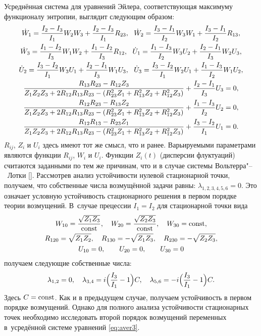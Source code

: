 Усреднённая система для уравнений Эйлера, соответствующая максимуму функционалу энтропии, выглядит следующим образом:
\begin{gather}
\dot{W}_{1}= \frac {I_2-I_3}{I_1} W_2 W_3 + \frac {I_2-I_3}{I_1} R_{23},~~\dot{W}_{2}= \frac {I_3-I_1}{I_2} W_3 W_1 + \frac {I_3-I_1}{I_2} R_{13},\notag \\
\dot{W}_{3}= \frac {I_1-I_2}{I_3} W_1 W_2 + \frac {I_1-I_2}{I_3} R_{12},~~
\dot{U}_{1}= \frac {I_1-I_3}{I_2} W_3 U_2 + \frac {I_2-I_1}{I_3} W_2 U_3,\notag \\
\dot{U}_{2}= \frac {I_3-I_2}{I_1} W_3 U_1 + \frac {I_2-I_1}{I_3} W_1 U_3,~~\dot{U}_{3}= \frac {I_3-I_2}{I_1} W_2 U_1 + \frac {I_1-I_3}{I_2} W_1 U_2, \label{eq:aver3}\\
\frac {R_{13}R_{23}-R_{12}Z_3}{Z_1 Z_2 Z_3 + 2 R_{12}R_{13}R_{23}-(R_{23}^2 Z_1 + R_{13}^2 Z_2 + R_{12}^2 Z_3)}+ \frac {I_2-I_1}{I_3} U_3=0, \notag \\
\frac {R_{12}R_{23}-R_{13}Z_2}{Z_1 Z_2 Z_3 + 2 R_{12}R_{13}R_{23}-(R_{23}^2 Z_1 + R_{13}^2 Z_2 + R_{12}^2 Z_3)}+ \frac {I_1-I_3}{I_2} U_2=0, \notag \\
\frac {R_{12}R_{13}-R_{23}Z_1}{Z_1 Z_2 Z_3 + 2 R_{12}R_{13}R_{23}-(R_{23}^2 Z_1 + R_{13}^2 Z_2 + R_{12}^2 Z_3)}+ \frac {I_3-I_2}{I_1} U_1=0. \notag
\end{gather}
$R_{ij}$, $Z_i$ и $U_i$ здесь имеют тот же смысл, что и ранее.
Варьируемыми параметрами являются функции $R_{ij}$, $W_i$ и $U_i$.
Функции $Z_i(t)$ (дисперсии флуктуаций) считаются заданными по тем же причинам, что и в случае системы Вольтерра"--~Лотки
[]. 
Рассмотрев анализ устойчивости нулевой стационарной точки, получаем, что собственные числа возмущённой задачи равны:
$
\lambda_{1,2,3,4,5,6}=0.
$
Это означает условную устойчивость стационарного решения в первом порядке теории возмущений. 
В~случае прецессии $I_1=I_2$ для стационарной точки вида
\begin{gather}
W_{10}= \frac {\sqrt{Z_1 Z_3}}{{\rm const}},\quad 
W_{20}= \frac {\sqrt{Z_2 Z_3}}{{\rm const}},\quad 
W_{30}= {\rm const},  \\
R_{120}=\sqrt{Z_1 Z_2},\quad 
R_{130}=-\sqrt{Z_1 Z_3},\quad 
R_{230}=-\sqrt{Z_2 Z_3}, \\
U_{10}=0,\qquad U_{20}=0,
\qquad U_{30}=0
\end{gather}
получаем следующие собственные числа:
\begin{equation}
\lambda_{1,2}=0,\quad \lambda_{3,4}=i \Bigl(\frac {I_3}{I_1}-1\Bigr)C, \quad \lambda_{5,6}=-i \Bigl(\frac {I_3}{I_1}-1\Bigr)C.
\end{equation}
Здесь $C={\rm const}$. Как и в предыдущем случае, получаем устойчивость в первом порядке возмущений. 
Однако для полного анализа устойчивости стационарных точек необходимо исследовать второй порядок возмущений переменных в~усредённой системе уравнений \eqref{eq:aver3}.

